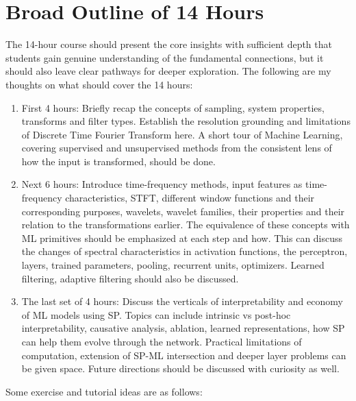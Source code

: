\documentclass[12pt]{article}
\begin{document}
\section{Broad Outline of 14 Hours}
The 14-hour course should present the core insights with sufficient depth that students gain genuine understanding of the fundamental connections, but it should also leave clear pathways for deeper exploration. The following are my thoughts on what should cover the 14 hours: 
\begin{enumerate}
    \item First 4 hours: Briefly recap the concepts of sampling, system properties, transforms and filter types. Establish the resolution grounding and limitations of Discrete Time Fourier Transform here. A short tour of Machine Learning, covering supervised and unsupervised methods from the consistent lens of how the input is transformed, should be done.
    \item Next 6 hours: Introduce time-frequency methods, input features as time-frequency characteristics, STFT, different window functions and their corresponding purposes, wavelets, wavelet families, their properties and their relation to the transformations earlier. The equivalence of these concepts with ML primitives should be emphasized at each step and how. This can discuss the changes of spectral characteristics in activation functions, the perceptron, layers, trained parameters, pooling, recurrent units, optimizers. Learned filtering, adaptive filtering should also be discussed.
    \item The last set of 4 hours: Discuss the verticals of interpretability and economy of ML models using SP. Topics can include intrinsic vs post-hoc interpretability, causative analysis, ablation, learned representations, how SP can help them evolve through the network. Practical limitations of computation, extension of SP-ML intersection and deeper layer problems can be given space. Future directions should be discussed with curiosity as well.
\end{enumerate}
Some exercise and tutorial ideas are as follows:
\end{document}
